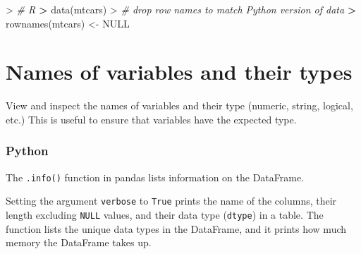 \documentclass[
]{book}
\newenvironment{Shaded}{\begin{snugshade}}{\end{snugshade}}
\newcommand{\CommentTok}[1]{\textcolor[rgb]{0.56,0.35,0.01}{\textit{#1}}}
\newcommand{\ConstantTok}[1]{\textcolor[rgb]{0.00,0.00,0.00}{#1}}
\newcommand{\ErrorTok}[1]{\textcolor[rgb]{0.64,0.00,0.00}{\textbf{#1}}}
\newcommand{\FunctionTok}[1]{\textcolor[rgb]{0.00,0.00,0.00}{#1}}
\newcommand{\NormalTok}[1]{#1}
\newcommand{\OtherTok}[1]{\textcolor[rgb]{0.56,0.35,0.01}{#1}}
\newcommand{\SpecialCharTok}[1]{\textcolor[rgb]{0.00,0.00,0.00}{#1}}
\begin{document}
\begin{Shaded}
\begin{Highlighting}[]
\SpecialCharTok{\textgreater{}} \CommentTok{\# R}
\ErrorTok{\textgreater{}} \FunctionTok{data}\NormalTok{(mtcars)}
\SpecialCharTok{\textgreater{}} \CommentTok{\# drop row names to match Python version of data}
\ErrorTok{\textgreater{}} \FunctionTok{rownames}\NormalTok{(mtcars) }\OtherTok{\textless{}{-}} \ConstantTok{NULL}
\end{Highlighting}
\end{Shaded}

\hypertarget{names-of-variables-and-their-types}{%
\section{Names of variables and their types}\label{names-of-variables-and-their-types}}

View and inspect the names of variables and their type (numeric, string, logical, etc.) This is useful to ensure that variables have the expected type.

\hypertarget{python-17}{%
\subsubsection*{Python}\label{python-17}}

The \texttt{.info()} function in pandas lists information on the DataFrame.

Setting the argument \texttt{verbose} to \texttt{True} prints the name of the columns, their length excluding \texttt{NULL} values, and their data type (\texttt{dtype}) in a table. The function lists the unique data types in the DataFrame, and it prints how much memory the DataFrame takes up.
\end{document}
